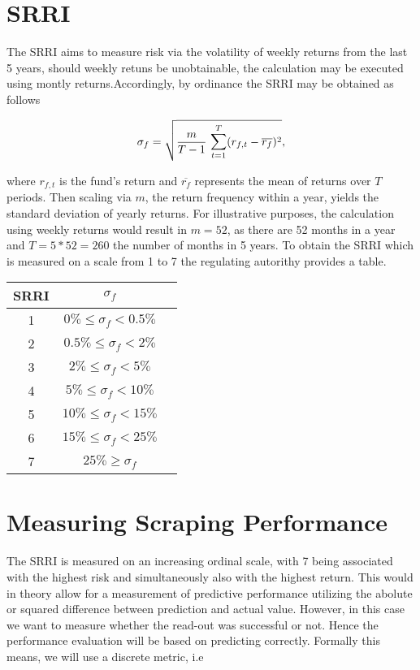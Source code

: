 \documentclass[aodsor,preprint]{imsart}
\numberwithin{equation}{section}
\theoremstyle{plain}
\begin{document}
\newpage

\section{SRRI}

The SRRI aims to measure risk via the volatility of weekly returns from the last 5 years, should weekly retuns be unobtainable, the calculation may be executed using montly returns.Accordingly, by ordinance the SRRI may be obtained as follows

\[
\sigma_f = \sqrt{\frac{m}{T - 1}\text{ }\mathlarger{\sum}_{t = 1}^{T} (r_{f, t} - \overline{r_f})^2},
\]

where $r_{f, t}$ is the fund's return and $\overline{r_f}$ represents the mean of returns over $T$ periods. Then scaling via  $m$, the return frequency within a year, yields the standard deviation of yearly returns. For illustrative purposes, the calculation using weekly returns would result in $m = 52$, as there are 52 months in a year and $T = 5 * 52 = 260$ the number of months in 5 years. To obtain the SRRI which is measured on a scale from 1 to 7 the regulating autorithy provides a table.
\begin{center}
\begin{tabular}{|c|c|c}
	\hline
	SRRI & $\sigma_f$ \\
	\hline
	1 & $0\% \leq\sigma_f<0.5\%$\\
	\hline
	2 & $0.5\%\leq\sigma_f<2\%$\\
	\hline
	3 & $2\%\leq\sigma_f<5\%$\\
	\hline
	4 & $5\%\leq\sigma_f<10\%$\\
	\hline
	5 & $10\%\leq\sigma_f<15\%$\\
	\hline
	6 & $15\%\leq\sigma_f<25\%$\\
	\hline
	7 & $25\%\geq\sigma_f$\\
	\hline
\end{tabular}
\end{center}

\section{Measuring Scraping Performance}

The SRRI is measured on an increasing ordinal scale, with 7 being associated with the highest risk and simultaneously also with the highest return. This would in theory allow for a measurement of predictive performance utilizing the abolute or squared difference between prediction and actual value. However, in this case we want to measure whether the read-out was successful or not. Hence the performance evaluation will be based on predicting correctly. Formally this means, we will use a discrete metric, i.e
\end{document}
